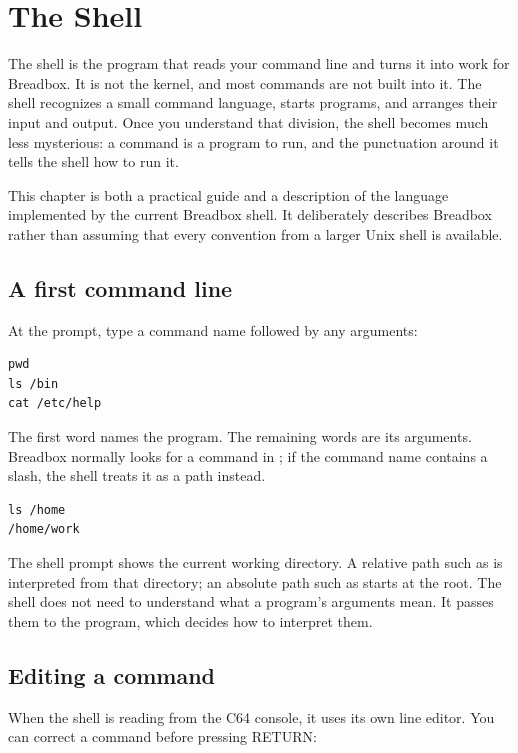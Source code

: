 \chapter{The Shell}
\label{ch:shell}

The shell is the program that reads your command line and turns it into work for Breadbox. It is not the kernel, and most commands are not built into it. The shell recognizes a small command language, starts programs, and arranges their input and output. Once you understand that division, the shell becomes much less mysterious: a command is a program to run, and the punctuation around it tells the shell how to run it.

This chapter is both a practical guide and a description of the language implemented by the current Breadbox shell. It deliberately describes Breadbox rather than assuming that every convention from a larger Unix shell is available.

\section{A first command line}

At the prompt, type a command name followed by any arguments:

\begin{lstlisting}
pwd
ls /bin
cat /etc/help
\end{lstlisting}

The first word names the program. The remaining words are its arguments. Breadbox normally looks for a command in ; if the command name contains a slash, the shell treats it as a path instead.

\begin{lstlisting}
ls /home
/home/work
\end{lstlisting}

The shell prompt shows the current working directory. A relative path such as  is interpreted from that directory; an absolute path such as  starts at the root. The shell does not need to understand what a program's arguments mean. It passes them to the program, which decides how to interpret them.

\section{Editing a command}

When the shell is reading from the C64 console, it uses its own line editor. You can correct a command before pressing RETURN:

